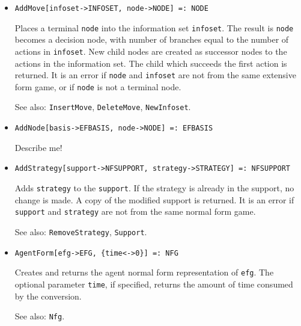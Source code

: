 \begin{itemize}
\item{}
\protect \large \begin{verbatim} 
AddMove[infoset->INFOSET, node->NODE] =: NODE 
\end{verbatim}\normalsize

\bd
Places a terminal \verb+node+ into the information set
\verb+infoset+.  The result is \verb+node+ becomes a decision node,
with number of branches equal to the number of actions in \verb+infoset+.
New child nodes are created as successor nodes to the actions in the
information set.  The child which succeeds the first action is returned.
It is an error if \verb+node+ and \verb+infoset+ are not from the same
extensive form game, or if \verb+node+ is not a terminal node.

\item [See also:] \verb+InsertMove+, \verb+DeleteMove+,
\verb+NewInfoset+.  
\ed

\item{}
\protect \large \begin{verbatim}
AddNode[basis->EFBASIS, node->NODE] =: EFBASIS
\end{verbatim}\normalsize

\bd
Describe me!
\ed

\item{}
\protect \large \begin{verbatim}
AddStrategy[support->NFSUPPORT, strategy->STRATEGY] =: NFSUPPORT 
\end{verbatim}\normalsize

\bd
Adds \verb+strategy+ to the \verb+support+.  If the strategy is already
in the support, no change is made.  A copy of the modified support is
returned.  It is an error if \verb+support+ and \verb+strategy+ are not
from the same normal form game.

\item [See also:] \verb+RemoveStrategy+, \verb+Support+.
\ed

\item{}
\protect \large \begin{verbatim}
AgentForm[efg->EFG, {time<->0}] =: NFG 
\end{verbatim}\normalsize

\bd
Creates and returns the agent normal form representation of \verb+efg+.
The optional parameter \verb+time+, if specified, returns the amount
of time consumed by the conversion.

\item [See also:] \verb+Nfg+.
\ed


\end{itemize}
